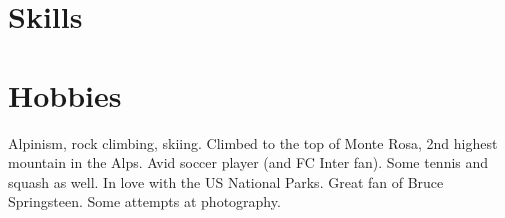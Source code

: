 \documentclass[a4paper]{moderncv}
\begin{document}

%
%
%
%
%
%
%
%

\section{Skills}


\section{Hobbies}
Alpinism, rock climbing, skiing. Climbed to the top of Monte Rosa, 2nd highest mountain in the Alps.
\newline{}
Avid soccer player (and FC Inter fan). Some tennis and squash as well. In love with the US National Parks.
\newline{}
Great fan of Bruce Springsteen. Some attempts at photography.%



 
\end{document}
